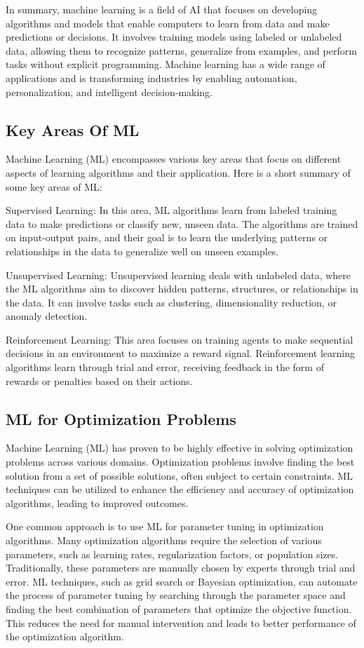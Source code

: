 In summary, machine learning is a field of AI that focuses on developing algorithms and models that enable computers to learn from data and make predictions or decisions. It involves training models using labeled or unlabeled data, allowing them to recognize patterns, generalize from examples, and perform tasks without explicit programming. Machine learning has a wide range of applications and is transforming industries by enabling automation, personalization, and intelligent decision-making.


\subsection{Key Areas Of ML}

Machine Learning (ML) encompasses various key areas that focus on different aspects of learning algorithms and their application. Here is a short summary of some key areas of ML:


Supervised Learning: In this area, ML algorithms learn from labeled training data to make predictions or classify new, unseen data. The algorithms are trained on input-output pairs, and their goal is to learn the underlying patterns or relationships in the data to generalize well on unseen examples.


Unsupervised Learning: Unsupervised learning deals with unlabeled data, where the ML algorithms aim to discover hidden patterns, structures, or relationships in the data. It can involve tasks such as clustering, dimensionality reduction, or anomaly detection.


Reinforcement Learning: This area focuses on training agents to make sequential decisions in an environment to maximize a reward signal. Reinforcement learning algorithms learn through trial and error, receiving feedback in the form of rewards or penalties based on their actions.


\subsection{ML for Optimization Problems}
Machine Learning (ML) has proven to be highly effective in solving optimization problems across various domains. Optimization problems involve finding the best solution from a set of possible solutions, often subject to certain constraints. ML techniques can be utilized to enhance the efficiency and accuracy of optimization algorithms, leading to improved outcomes.

One common approach is to use ML for parameter tuning in optimization algorithms. Many optimization algorithms require the selection of various parameters, such as learning rates, regularization factors, or population sizes. Traditionally, these parameters are manually chosen by experts through trial and error. ML techniques, such as grid search or Bayesian optimization, can automate the process of parameter tuning by searching through the parameter space and finding the best combination of parameters that optimize the objective function. This reduces the need for manual intervention and leads to better performance of the optimization algorithm.

